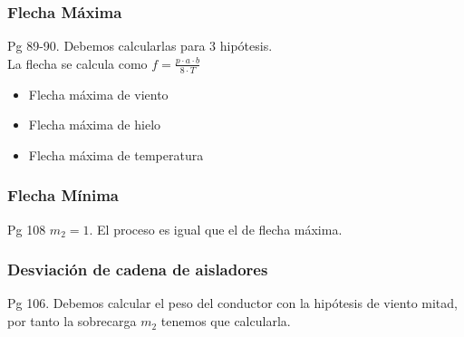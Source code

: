 \documentclass{article}
\begin{document}
\subsubsection{Flecha Máxima}
Pg 89-90. Debemos calcularlas para 3 hipótesis. 
\\

La flecha se calcula como $f=\frac{p \cdot a \cdot b}{8 \cdot T}$
\begin{itemize}
    \item Flecha máxima de viento
    \item Flecha máxima de hielo
    \item Flecha máxima de temperatura
\end{itemize}
\subsubsection{Flecha Mínima}
Pg 108 $m_2 = 1$. El proceso es igual que el de flecha máxima.
\subsubsection{Desviación de cadena de aisladores}
Pg 106. Debemos calcular el peso del conductor con la hipótesis de viento mitad, por tanto la sobrecarga $m_2$ tenemos que calcularla.
\end{document}
